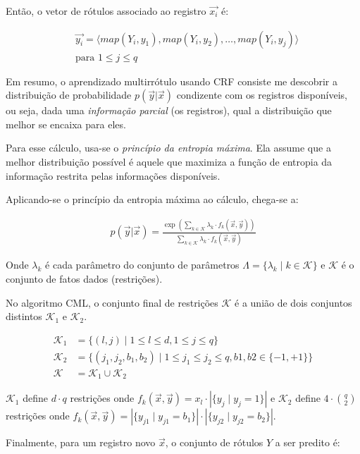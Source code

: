 \documentclass[runningheads,a4paper]{llncs}
\begin{document}
Então, o vetor de rótulos associado ao registro $\vec{x_i}$ é:

\begin{align*}
&\vec{y_i} = \langle map(Y_i, y_1), map(Y_i, y_2), \dots, map(Y_i, y_j) \rangle \\
&\text{para } 1 \leq j \leq q  
\end{align*}

Em resumo, o aprendizado multirrótulo usando CRF consiste me descobrir a distribuição de probabilidade $p(\vec{y} | \vec{x})$ condizente com os registros disponíveis, ou seja, dada uma \textit{informação parcial} (os registros), qual a distribuição que melhor se encaixa para eles.

Para esse cálculo, usa-se o \textit{princípio da entropia máxima}. Ela assume que a melhor distribuição possível é aquele que maximiza a função de entropia da informação restrita pelas informações disponíveis.

Aplicando-se o princípio da entropia máxima ao cálculo, chega-se a:

\begin{align*}
p(\vec{y} | \vec{x}) = \frac{\exp \left( \sum_{k \in \mathcal{K}} \lambda_k \cdot f_k(\vec{x}, \vec{y}) \right)}{\sum_{k \in \mathcal{K}} \lambda_k \cdot f_k(\vec{x}, \vec{y})}
\end{align*}

Onde $\lambda_k$ é cada parâmetro do conjunto de parâmetros $\Lambda = \{ \lambda_k \mid k \in \mathcal{K} \}$ e $\mathcal{K}$ é o conjunto de fatos dados (restrições).

No algoritmo CML, o conjunto final de restrições $\mathcal{K}$ é a união de dois conjuntos distintos $\mathcal{K}_1$ e $\mathcal{K}_2$. 

\begin{align*}
	\mathcal{K}_1 &= \{ (l, j) \mid 1 \leq l \leq d, 1 \leq j \leq q \} \\
	\mathcal{K}_2 &= \{ (j_1, j_2, b_1, b_2) \mid 1 \leq j_1 \leq j_2 \leq q, b1, b2 \in \{ -1, +1 \} \} \\
	  \mathcal{K} &= \mathcal{K}_1 \cup \mathcal{K}_2
\end{align*}

$\mathcal{K}_1$ define $d \cdot q$ restrições onde $f_k(\vec{x}, \vec{y}) = x_l \cdot | \{ y_j \mid y_j = 1\} |$ e $\mathcal{K}_2$ define $4 \cdot {q \choose 2}$ restrições onde $f_k(\vec{x}, \vec{y}) = |\{ y_{j1} \mid y_{j1} = b_1 \}| \cdot |\{ y_{j2} \mid y_{j2} = b_2 \}|$.

Finalmente, para um registro novo $\vec{x}$, o conjunto de rótulos $Y$ a ser predito é:
\end{document}
